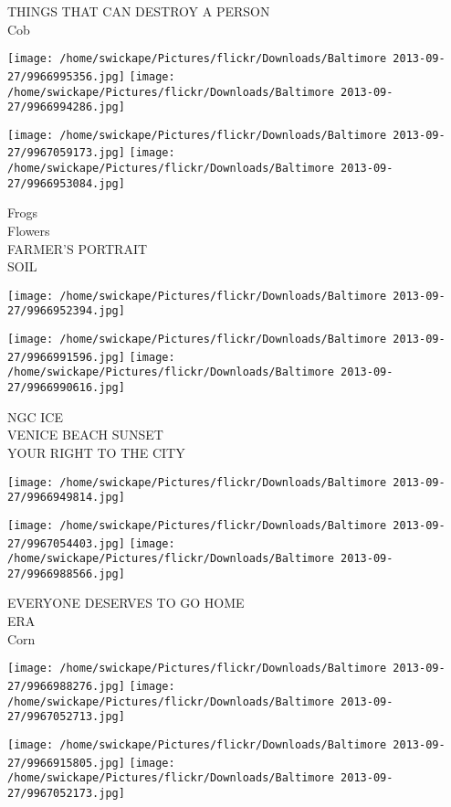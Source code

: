 \documentclass[10pt,letterpaper]{article}
\begin{document}
THINGS THAT CAN DESTROY A PERSON\\
Cob
\pagebreak

\texttt{[image: /home/swickape/Pictures/flickr/Downloads/Baltimore 2013-09-27/9966995356.jpg]}
\texttt{[image: /home/swickape/Pictures/flickr/Downloads/Baltimore 2013-09-27/9966994286.jpg]}

\texttt{[image: /home/swickape/Pictures/flickr/Downloads/Baltimore 2013-09-27/9967059173.jpg]}
\texttt{[image: /home/swickape/Pictures/flickr/Downloads/Baltimore 2013-09-27/9966953084.jpg]}

Frogs\\
Flowers\\
FARMER'S PORTRAIT\\
SOIL
\pagebreak

\texttt{[image: /home/swickape/Pictures/flickr/Downloads/Baltimore 2013-09-27/9966952394.jpg]}

\vspace{0.25in}
\texttt{[image: /home/swickape/Pictures/flickr/Downloads/Baltimore 2013-09-27/9966991596.jpg]}
\texttt{[image: /home/swickape/Pictures/flickr/Downloads/Baltimore 2013-09-27/9966990616.jpg]}

NGC ICE\\
VENICE BEACH SUNSET\\
YOUR RIGHT TO THE CITY
\pagebreak

\texttt{[image: /home/swickape/Pictures/flickr/Downloads/Baltimore 2013-09-27/9966949814.jpg]}

\vspace{0.25in}
\texttt{[image: /home/swickape/Pictures/flickr/Downloads/Baltimore 2013-09-27/9967054403.jpg]}
\texttt{[image: /home/swickape/Pictures/flickr/Downloads/Baltimore 2013-09-27/9966988566.jpg]}

EVERYONE DESERVES TO GO HOME\\
ERA\\
Corn
\pagebreak

\texttt{[image: /home/swickape/Pictures/flickr/Downloads/Baltimore 2013-09-27/9966988276.jpg]}
\texttt{[image: /home/swickape/Pictures/flickr/Downloads/Baltimore 2013-09-27/9967052713.jpg]}

\texttt{[image: /home/swickape/Pictures/flickr/Downloads/Baltimore 2013-09-27/9966915805.jpg]}
\texttt{[image: /home/swickape/Pictures/flickr/Downloads/Baltimore 2013-09-27/9967052173.jpg]}
\end{document}

